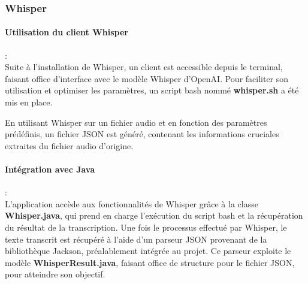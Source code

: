 \subsubsection{Whisper}
\label{sec:whisperImpl}

\paragraph*{Utilisation du client Whisper} : \\

Suite à l'installation de Whisper, un client est accessible depuis le terminal, faisant office d'interface avec le modèle Whisper d'OpenAI. 
Pour faciliter son utilisation et optimiser les paramètres, un script bash nommé \textbf{whisper.sh} a été mis en place.

En utilisant Whisper sur un fichier audio et en fonction des paramètres prédéfinis, un fichier JSON est généré, contenant les informations cruciales extraites du fichier audio d'origine.

\paragraph*{Intégration avec Java} : \\

L'application accède aux fonctionnalités de Whisper grâce à la classe \textbf{Whisper.java}, qui prend en charge l'exécution du script bash et la récupération du résultat de la transcription. 
Une fois le processus effectué par Whisper, le texte transcrit est récupéré à l'aide d'un parseur JSON provenant de la bibliothèque Jackson, préalablement intégrée au projet. 
Ce parseur exploite le modèle \textbf{WhisperResult.java}, faisant office de structure pour le fichier JSON, pour atteindre son objectif.